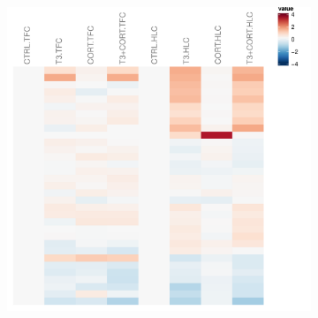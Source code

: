 \begin{figure}[!htbp]
\centering
\vspace{1\baselineskip}
%
%
\begin{subfigure}{0.45\textwidth}
	\includegraphics[width=\textwidth]
	{Figures/comparison-tfc-hlc-medna/comparison-tfc-hlc-medna-all.pdf}
	\caption{}
	\label{subfig:comparison-tfc-hlc-medna-all}
\end{subfigure}
~
\begin{subfigure}{0.45\textwidth}

\end{subfigure}
\end{figure}
